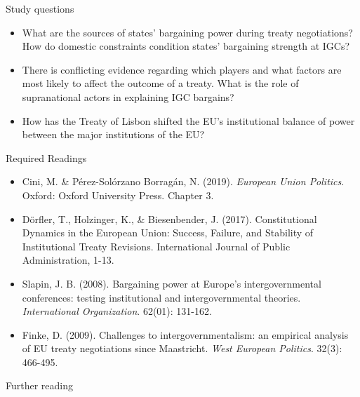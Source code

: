 Study questions

\begin{itemize}
	\item What are the sources of states’ bargaining power during treaty negotiations? How do domestic constraints condition states’ bargaining strength at IGCs?  
    \item There is conflicting evidence regarding which players and what factors are most likely to affect the outcome of a treaty. What is the role of supranational actors in explaining IGC bargains?
    \item How has the Treaty of Lisbon shifted the EU’s institutional balance of power between the major institutions of the EU?
\end{itemize}

\noindent Required Readings

\begin{itemize}
	\item Cini, M. \& P\'{e}rez-Sol\'{o}rzano Borrag\'{a}n, N. (2019). \textit{European Union Politics}. Oxford: Oxford University Press. Chapter 3.
	\item D{\"o}rfler, T., Holzinger, K., \& Biesenbender, J. (2017). Constitutional Dynamics in the European Union: Success, Failure, and Stability of Institutional Treaty Revisions. International Journal of Public Administration, 1-13.
	\item Slapin, J. B. (2008). Bargaining power at Europe's intergovernmental conferences: testing institutional and intergovernmental theories. \textit{International Organization}. 62(01): 131-162.
	\item Finke, D. (2009). Challenges to intergovernmentalism: an empirical analysis of EU treaty negotiations since Maastricht. \textit{West European Politics}. 32(3): 466-495.
\end{itemize}

\noindent Further reading

